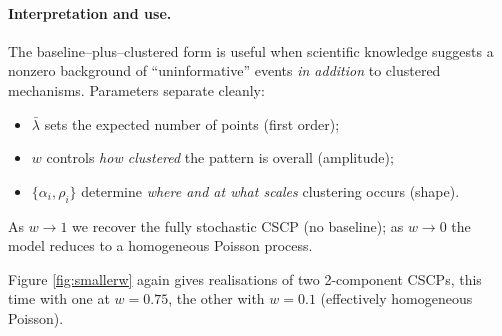 \documentclass[11pt]{article}
\begin{document}
\paragraph{Interpretation and use.}
The baseline–plus–clustered form is useful when scientific knowledge suggests a
nonzero background of “uninformative” events \emph{in addition} to clustered
mechanisms. Parameters separate cleanly:
\begin{itemize}
	\item $\bar\lambda$ sets the expected number of points (first order);
	\item $w$ controls \emph{how clustered} the pattern is overall (amplitude);
	\item $\{\alpha_i,\rho_i\}$ determine \emph{where and at what scales} clustering
	occurs (shape).
\end{itemize}
As $w\to 1$ we recover the fully stochastic CSCP (no baseline); as $w\to 0$ the
model reduces to a homogeneous Poisson process.

Figure \ref{fig:smallerw} again gives realisations of two 2-component CSCPs, this time with one at $w=0.75$, the other with $w=0.1$ (effectively homogeneous Poisson).
\end{document}
